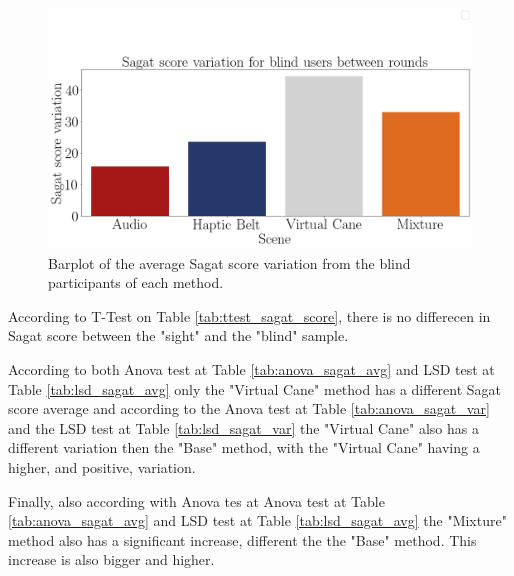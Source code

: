 



\begin{figure}[!htb]
    \centering
    \includegraphics[width = 0.8\linewidth]{Resultados/Sagat/Figuras/png/barplot_sagat_var_scene_blind.png}
    \caption{Barplot of the average Sagat score variation from the blind participants of each method.}
    \label{fig:barplot_sagat_var_scene_blind}
\end{figure}

According to T-Test on Table \ref{tab:ttest_sagat_score}, there is no differecen in Sagat score between the "sight" and the "blind" sample.

According to both Anova test at Table \ref{tab:anova_sagat_avg} and LSD test at Table \ref{tab:lsd_sagat_avg} only the "Virtual Cane" method has a different Sagat score average and according to the Anova test at Table \ref{tab:anova_sagat_var} and the LSD test at Table \ref{tab:lsd_sagat_var} the "Virtual Cane" also has a different variation then the "Base" method, with the "Virtual Cane" having a higher, and positive, variation.

Finally, also according with Anova tes at Anova test at Table \ref{tab:anova_sagat_avg} and LSD test at Table \ref{tab:lsd_sagat_avg} the "Mixture" method also has a significant increase, different the the "Base" method. This increase is also bigger and higher.

\FloatBarrier